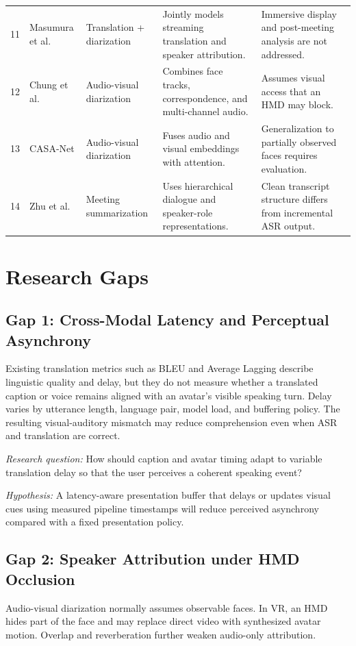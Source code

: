 \documentclass[conference]{IEEEtran}
\begin{document}
\begin{table}[t]
\begin{tabularx}{\textwidth}{p{}p{}p{}YY}
11 & Masumura et al. \cite{masumura2023diarist} & Translation + diarization & Jointly models streaming translation and speaker attribution. & Immersive display and post-meeting analysis are not addressed. \\
12 & Chung et al. \cite{chung2019whosaid} & Audio-visual diarization & Combines face tracks, correspondence, and multi-channel audio. & Assumes visual access that an HMD may block. \\
13 & CASA-Net \cite{casa2025} & Audio-visual diarization & Fuses audio and visual embeddings with attention. & Generalization to partially observed faces requires evaluation. \\
14 & Zhu et al. \cite{zhu2020hmnet} & Meeting summarization & Uses hierarchical dialogue and speaker-role representations. & Clean transcript structure differs from incremental ASR output. \\
\bottomrule
\end{tabularx}
\end{table}

\section{Research Gaps}

\subsection{Gap 1: Cross-Modal Latency and Perceptual Asynchrony}
Existing translation metrics such as BLEU and Average Lagging describe linguistic quality and delay, but they do not measure whether a translated caption or voice remains aligned with an avatar's visible speaking turn. Delay varies by utterance length, language pair, model load, and buffering policy. The resulting visual-auditory mismatch may reduce comprehension even when ASR and translation are correct.

\textit{Research question:} How should caption and avatar timing adapt to variable translation delay so that the user perceives a coherent speaking event?

\textit{Hypothesis:} A latency-aware presentation buffer that delays or updates visual cues using measured pipeline timestamps will reduce perceived asynchrony compared with a fixed presentation policy.

\subsection{Gap 2: Speaker Attribution under HMD Occlusion}
Audio-visual diarization normally assumes observable faces. In VR, an HMD hides part of the face and may replace direct video with synthesized avatar motion. Overlap and reverberation further weaken audio-only attribution.
\end{document}
